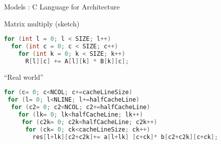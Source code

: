 \begin{frame}[fragile]{Models : C Language for Architecture}
      \begin{block}{Matrix multiply (sketch)}
        \begin{lstlisting}[language=C,basicstyle={\normalsize\ttfamily}]
for (int l = 0; l < SIZE; l++)
  for (int c = 0; c < SIZE; c++)
    for (int k = 0; k < SIZE; k++)
      R[l][c] += A[l][k] * B[k][c];
        \end{lstlisting}

    \end{block}

    \begin{alertblock}{``Real world''}
        \begin{lstlisting}[language=C,basicstyle={\normalsize\ttfamily}]
for (c= 0; c<NCOL; c+=cacheLineSize)
 for (l= 0; l<NLINE; l+=halfCacheLine)
  for (c2= 0; c2<NCOL; c2+=halfCacheLine)
    for (lk= 0; lk<halfCacheLine; lk++)
     for (c2k= 0; c2k<halfCacheLine; c2k++)
      for (ck= 0; ck<cacheLineSize; ck++)
        res[l+lk][c2+c2k]+=	a[l+lk]	[c+ck]*	b[c2+c2k][c+ck];
    \end{lstlisting}
    \end{alertblock}


\end{frame}

